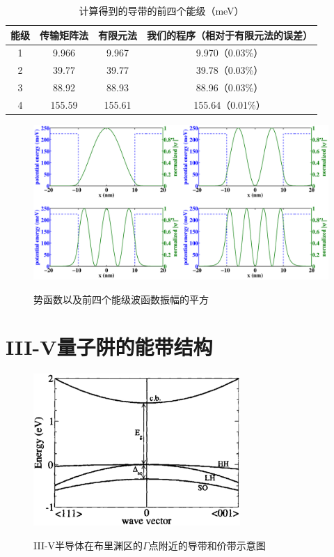 \documentclass[oneside]{ZJUthesis}
\begin{document}
\begin{table}[!t]
    \caption{计算得到的导带的前四个能级（meV）}
    \centering
    \label{tmm_sample_result}
    \begin{tabular}{cccc}
        \hline
        能级 & 传输矩阵法\cite{jonsson1990solving} & 有限元法\cite{nakamura1989finite} & 我们的程序（相对于有限元法的误差） \\
        \hline
        1       & 9.966              & 9.967            & 9.970（0.03\%） \\
        2       & 39.77              & 39.77            & 39.78（0.03\%） \\
        3       & 88.92              & 88.93            & 88.96（0.03\%） \\
        4       & 155.59            & 155.61          & 155.64（0.01\%） \\
        \hline
    \end{tabular}
\end{table}

\begin{figure}[!h]
  \centering
  \includegraphics[width=1.0\textwidth]{./Pictures/waves.eps}\\
  \caption{势函数以及前四个能级波函数振幅的平方}
  \label{fig_waves}
\end{figure}

\section{III-V量子阱的能带结构}

\begin{figure}[!h]
  \centering
  \includegraphics[width=0.7\textwidth]{./Pictures/bands.eps}\\
  \caption{III-V半导体在布里渊区的$\Gamma$点附近的导带和价带示意图}
  \label{fig_bands}
\end{figure}
\end{document}
